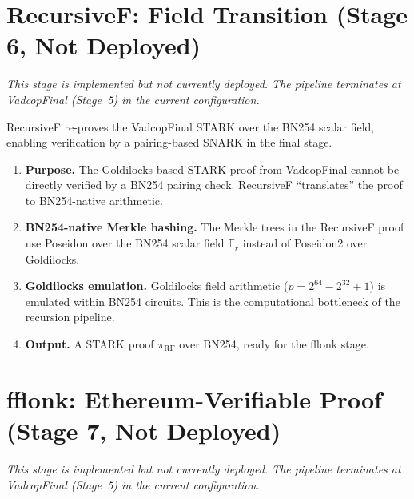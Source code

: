 \section{RecursiveF: Field Transition (Stage 6, Not Deployed)}
\label{sec:recursivef}

\emph{This stage is implemented but not currently deployed.
The pipeline terminates at VadcopFinal (Stage~5) in the current configuration.}

\medskip

RecursiveF re-proves the VadcopFinal STARK over the BN254 scalar field,
enabling verification by a pairing-based SNARK in the final stage.

\begin{enumerate}[label=(\roman*)]
  \item \textbf{Purpose.}
        The Goldilocks-based STARK proof from VadcopFinal cannot be
        directly verified by a BN254 pairing check.
        RecursiveF ``translates'' the proof to BN254-native arithmetic.

  \item \textbf{BN254-native Merkle hashing.}
        The Merkle trees in the RecursiveF proof use Poseidon over the
        BN254 scalar field $\mathbb{F}_r$ instead of Poseidon2 over Goldilocks.

  \item \textbf{Goldilocks emulation.}
        Goldilocks field arithmetic ($p = 2^{64} - 2^{32} + 1$) is
        emulated within BN254 circuits.
        This is the computational bottleneck of the recursion pipeline.

  \item \textbf{Output.}
        A STARK proof $\pi_{\mathrm{RF}}$ over BN254,
        ready for the fflonk stage.
\end{enumerate}

\section{fflonk: Ethereum-Verifiable Proof (Stage 7, Not Deployed)}
\label{sec:fflonk}

\emph{This stage is implemented but not currently deployed.
The pipeline terminates at VadcopFinal (Stage~5) in the current configuration.}

